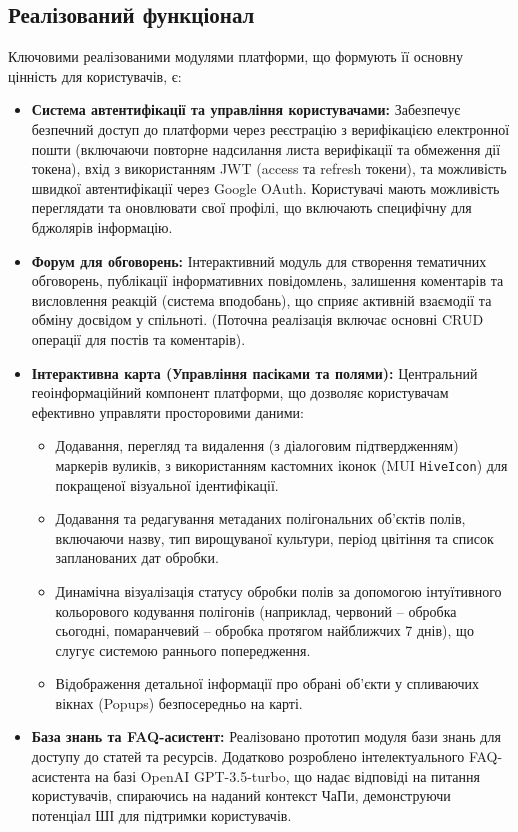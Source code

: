 \subsection*{Реалізований функціонал}
Ключовими реалізованими модулями платформи, що формують її основну цінність для користувачів, є:
\begin{itemize}
    \item \textbf{Система автентифікації та управління користувачами:} Забезпечує безпечний доступ до платформи через реєстрацію з верифікацією електронної пошти (включаючи повторне надсилання листа верифікації та обмеження дії токена), вхід з використанням JWT (access та refresh токени), та можливість швидкої автентифікації через Google OAuth. Користувачі мають можливість переглядати та оновлювати свої профілі, що включають специфічну для бджолярів інформацію.
    \item \textbf{Форум для обговорень:} Інтерактивний модуль для створення тематичних обговорень, публікації інформативних повідомлень, залишення коментарів та висловлення реакцій (система вподобань), що сприяє активній взаємодії та обміну досвідом у спільноті. (Поточна реалізація включає основні CRUD операції для постів та коментарів).
    \item \textbf{Інтерактивна карта (Управління пасіками та полями):} Центральний геоінформаційний компонент платформи, що дозволяє користувачам ефективно управляти просторовими даними:
        \begin{itemize}
            \item Додавання, перегляд та видалення (з діалоговим підтвердженням) маркерів вуликів, з використанням кастомних іконок (MUI \texttt{HiveIcon}) для покращеної візуальної ідентифікації.
            \item Додавання та редагування метаданих полігональних об'єктів полів, включаючи назву, тип вирощуваної культури, період цвітіння та список запланованих дат обробки.
            \item Динамічна візуалізація статусу обробки полів за допомогою інтуїтивного кольорового кодування полігонів (наприклад, червоний – обробка сьогодні, помаранчевий – обробка протягом найближчих 7 днів), що слугує системою раннього попередження.
            \item Відображення детальної інформації про обрані об'єкти у спливаючих вікнах (Popups) безпосередньо на карті.
        \end{itemize}
    \item \textbf{База знань та FAQ-асистент:} Реалізовано прототип модуля бази знань для доступу до статей та ресурсів. Додатково розроблено інтелектуального FAQ-асистента на базі OpenAI GPT-3.5-turbo, що надає відповіді на питання користувачів, спираючись на наданий контекст ЧаПи, демонструючи потенціал ШІ для підтримки користувачів.
\end{itemize}

